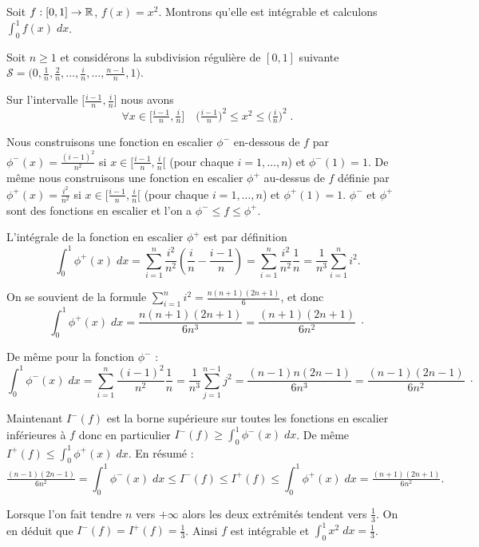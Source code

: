 \documentclass[class=report,crop=false]{standalone}
\begin{document}
\begin{exemple}
Soit $f:[0,1] \to \mathbb{R}$, $f(x)=x^2$. Montrons qu'elle est intégrable et calculons
$\int_0^1f(x) \; dx$.


Soit $n\ge 1$ et considérons la subdivision régulière de $[0,1]$ suivante
$\mathcal{S}=\big(0,\frac1n,\frac2n,\ldots,\frac in,\ldots, \frac{n-1}{n},1\big)$.

Sur l'intervalle $\big[\frac{i-1}{n},\frac in\big]$ nous avons
\[
\forall x \in \big[\tfrac{i-1}{n},\tfrac in\big] \quad  \big(\tfrac{i-1}{n}\big)^2 \le x^2 \le \big(\tfrac in\big)^2 \; .
\]

Nous construisons une fonction en escalier $\phi^-$ en-dessous de $f$  par
$\phi^-(x) = \frac{(i-1)^2}{n^2}$ si $x \in \big[\frac{i-1}{n},\frac in\big[$
(pour chaque $i=1,\ldots,n$) et $\phi^-(1)=1$.
De même nous construisons une fonction en escalier $\phi^+$ au-dessus de $f$ définie
par $\phi^+(x) = \frac{i^2}{n^2}$ si $x \in \big[\frac{i-1}{n},\frac in\big[$
(pour chaque $i=1,\ldots,n$) et $\phi^+(1)=1$.
$\phi^-$ et $\phi^+$ sont des fonctions en escalier et l'on a $\phi^- \le f \le \phi^+$.

L'intégrale de la fonction en escalier $\phi^+$ est par définition
\[
\int_0^1 \phi^+(x)\; dx = \sum_{i=1}^n  \frac{i^2}{n^2} \left(\frac in - \frac{i-1}{n}\right)
= \sum_{i=1}^n  \frac{i^2}{n^2} \frac 1n  = \frac{1}{n^3} \sum_{i=1}^n i^2.
\]

On se souvient de la formule $\sum_{i=1}^n i^2=\tfrac{n(n + 1)(2n + 1)}{6}$, et donc
\[
\int_0^1 \phi^+(x)\; dx = \frac{n(n + 1)(2n + 1)}{6n^3} =  \frac{(n + 1)(2n + 1)}{6n^2} \; \cdotp
\]

De même pour la fonction $\phi^-$ :
\[
\int_0^1 \phi^-(x)\; dx = \sum_{i=1}^n  \frac{(i-1)^2}{n^2} \frac 1n
= \frac{1}{n^3} \sum_{j=1}^{n-1} j^2 =\frac{(n-1)n(2n - 1)}{6n^3} =  \frac{(n - 1)(2n - 1)}{6n^2}\; \cdotp
\]

Maintenant $I^-(f)$ est la borne supérieure sur toutes les fonctions en escalier inférieures à $f$
donc en particulier $I^-(f) \ge \int_0^1 \phi^-(x)\; dx$. De même $I^+(f) \le \int_0^1 \phi^+(x)\; dx$.
En résumé :
$$\tfrac{(n - 1)(2n - 1)}{6n^2}=\int_0^1 \phi^-(x)\; dx \le I^-(f) \le I^+(f) \le \int_0^1 \phi^+(x)\; dx =\tfrac{(n + 1)(2n + 1)}{6n^2}.$$

Lorsque l'on fait tendre $n$ vers $+\infty$ alors les deux extrémités tendent vers $\frac13$.
On en déduit que $I^-(f)= I^+(f)=\frac13$. Ainsi $f$ est intégrable
et $\int_0^1 x^2\; dx = \frac13$.
\end{exemple}
\end{document}
